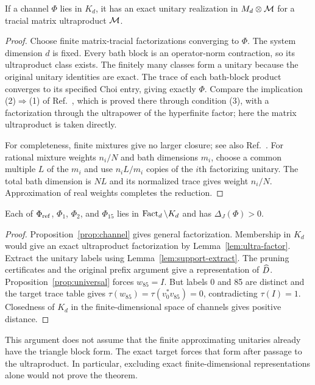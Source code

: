 \begin{lemma}\label{lem:ultra-factor}
If a channel $\Phi$ lies in $K_d$, it has an exact unitary realization in $M_d\otimes\mathcal M$
for a tracial matrix ultraproduct $\mathcal M$.
\end{lemma}
\begin{proof}
Choose finite matrix-tracial factorizations converging to $\Phi$. The system dimension $d$
is fixed. Every bath block is an operator-norm contraction, so its ultraproduct class exists.
The finitely many classes form a unitary because the original unitary identities are exact.
The trace of each bath-block product converges to its specified Choi entry, giving exactly
$\Phi$. Compare the implication (2)$\Rightarrow$(1) of Ref.~\cite[Theorem~3.6]{hm15}, which is
proved there through condition (3), with a factorization through the ultrapower of the
hyperfinite factor; here the matrix ultraproduct is taken directly.

For completeness, finite mixtures give no larger closure; see also
Ref.~\cite[Proposition~3.8(ii)]{musat}. For rational mixture weights
$n_i/N$ and bath dimensions $m_i$, choose a common multiple $L$ of the $m_i$ and use
$n_iL/m_i$ copies of the $i$th factorizing unitary. The total bath dimension is $NL$ and
its normalized trace gives weight $n_i/N$. Approximation of real weights completes the
reduction.
\end{proof}

\begin{theorem}\label{thm:nonapprox}
Each of $\Phi_{\mathrm{ref}}$, $\Phi_1$, $\Phi_2$, and $\Phi_{15}$ lies in
$\operatorname{Fact}_d\setminus K_d$ and has $\Delta_J(\Phi)>0$.
\end{theorem}
\begin{proof}
Proposition~\ref{prop:channel} gives general factorization. Membership in $K_d$ would give
an exact ultraproduct factorization by Lemma~\ref{lem:ultra-factor}. Extract the unitary
labels using Lemma~\ref{lem:support-extract}. The pruning certificates and the original
prefix argument give a representation of $\widehat D$. Proposition~\ref{prop:universal} forces
$w_{85}=I$. But labels 0 and 85 are distinct and the target trace table gives
$\tau(w_{85})=\tau(v_0^*v_{85})=0$, contradicting $\tau(I)=1$.
Closedness of $K_d$ in the finite-dimensional space of channels gives positive distance.
\end{proof}

This argument does not assume that the finite approximating unitaries already have the
triangle block form. The exact target forces that form after passage to the ultraproduct.
In particular, excluding exact finite-dimensional representations alone would not prove the
theorem.

